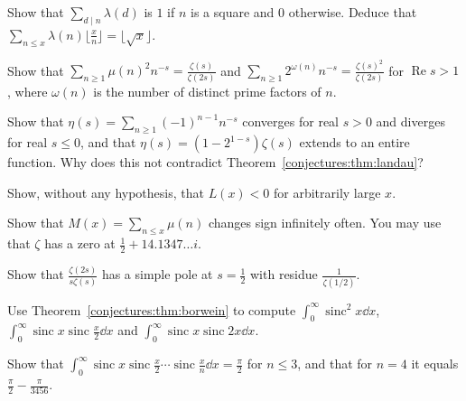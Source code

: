 \begin{exercise}[$\star$]\label{conjectures:ex:squares}
Show that $\sum_{d\mid n}\lambda(d)$ is $1$ if $n$ is a square and $0$ otherwise. Deduce that $\sum_{n\le x}\lambda(n)\bigl\lfloor\frac xn\bigr\rfloor=\lfloor\sqrt x\rfloor$.
\end{exercise}

\begin{exercise}[$\star$]\label{conjectures:ex:squarefree}
Show that $\sum_{n\ge1}\mu(n)^2n^{-s}=\frac{\zeta(s)}{\zeta(2s)}$ and $\sum_{n\ge1}2^{\omega(n)}n^{-s}=\frac{\zeta(s)^2}{\zeta(2s)}$ for $\operatorname{Re}s>1$, where
$\omega(n)$ is the number of distinct prime factors of $n$.
\end{exercise}

\begin{exercise}[$\star\star$]\label{conjectures:ex:etaentire}
Show that $\eta(s)=\sum_{n\ge1}(-1)^{n-1}n^{-s}$ converges for real $s>0$ and diverges for real $s\le0$, and that $\eta(s)=(1-2^{1-s})\zeta(s)$ extends to an entire
function. Why does this not contradict Theorem~\ref{conjectures:thm:landau}?
\end{exercise}

\begin{exercise}[$\star\star$]\label{conjectures:ex:Lnegative}
Show, without any hypothesis, that $L(x)<0$ for arbitrarily large $x$.
\end{exercise}

\begin{exercise}[$\star\star$]\label{conjectures:ex:mertenssign}
Show that $M(x)=\sum_{n\le x}\mu(n)$ changes sign infinitely often. You may use that $\zeta$ has a zero at $\frac12+14.1347\ldots i$.
\end{exercise}

\begin{exercise}[$\star$]\label{conjectures:ex:residue}
Show that $\frac{\zeta(2s)}{s\zeta(s)}$ has a simple pole at $s=\frac12$ with residue $\frac1{\zeta(1/2)}$.
\end{exercise}

\begin{exercise}[$\star$]\label{conjectures:ex:sincpairs}
Use Theorem~\ref{conjectures:thm:borwein} to compute $\int_0^\infty\operatorname{sinc}^2x\dd x$, $\int_0^\infty\operatorname{sinc}x\operatorname{sinc}\frac x2\dd x$ and
$\int_0^\infty\operatorname{sinc}x\operatorname{sinc}2x\dd x$.
\end{exercise}

\begin{exercise}[$\star\star$]\label{conjectures:ex:harmonicsinc}
Show that $\int_0^\infty\operatorname{sinc}x\operatorname{sinc}\frac x2\cdots\operatorname{sinc}\frac x{n}\dd x=\frac\pi2$ for $n\le3$, and that for $n=4$ it equals
$\frac\pi2-\frac\pi{3456}$.
\end{exercise}

